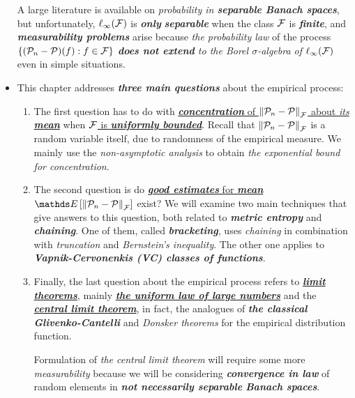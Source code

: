 \documentclass[11pt]{article}
\begin{document}
\begin{itemize}
\begin{remark}
A large literature is available on \emph{probability in \textbf{separable Banach spaces}}, but unfortunately, $\ell_{\infty}({\mathcal F})$ is \emph{\textbf{only}} \emph{\textbf{separable}} when the class ${\mathcal F}$ is \emph{\textbf{finite}}, and \emph{\textbf{measurability problems}} arise because \emph{the probability law} of the process $\left\{ ({\mathcal P}_n - {\mathcal P})(f) : f \in {\mathcal F}\right\}$ \emph{\textbf{does not extend} to the Borel $\sigma$-algebra of $\ell_{\infty}({\mathcal F})$} even in simple situations.
\end{remark}

\item \begin{remark}
This chapter addresses \emph{\textbf{three main questions}} about the empirical process:
\begin{enumerate}
\item The first question has to do with \underline{\emph{\textbf{concentration}} of $\left\|{\mathcal P}_n  - {\mathcal P}\right\|_{{\mathcal F}}$ about \emph{its \textbf{mean}}} when \underline{${\mathcal F}$ is \emph{\textbf{uniformly bounded}}}. Recall that $\left\|{\mathcal P}_n  - {\mathcal P}\right\|_{{\mathcal F}}$ is a random variable itself, due to randomness of the empirical measure. We mainly use the \emph{non-asymptotic analysis} to obtain \emph{the exponential bound for concentration}.

\item The second question is do \underline{\emph{\textbf{good estimates}} for \emph{\textbf{mean}} $\E{}{\norm{\cP_n  - \cP}{\cF}}$} exist? We will examine two main techniques that give answers to this question, both related to \emph{\textbf{metric entropy}} and \emph{\textbf{chaining}}. One of them, called \emph{\textbf{bracketing}}, uses \emph{chaining} in combination with \emph{truncation} and \emph{Bernstein's inequality}. The other one applies to \emph{\textbf{Vapnik-Cervonenkis (VC) classes of functions}}.

\item Finally, the last question about the empirical process refers to \underline{\emph{\textbf{limit theorems}}}, mainly \underline{\emph{\textbf{the uniform law of large numbers}}} and the \underline{\emph{\textbf{central limit theorem}}}, in fact, the analogues of \emph{\textbf{the classical Glivenko-Cantelli}} and \emph{Donsker theorems} for the empirical distribution function.

Formulation of \emph{the central limit theorem} will require some more \emph{measurability} because we will be considering \emph{\textbf{convergence in law}} of random elements in \emph{\textbf{not necessarily separable} \textbf{Banach spaces}}.
\end{enumerate}
\end{remark}
\end{itemize}
\end{document}
